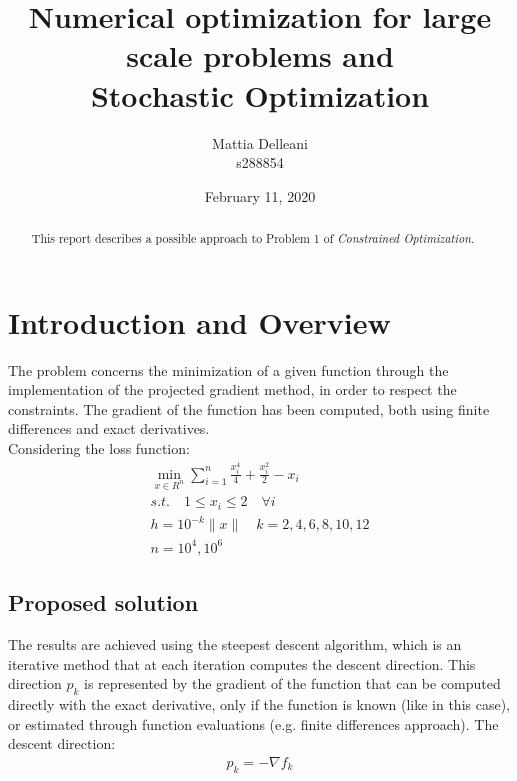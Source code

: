 \documentclass{article}
\title{Numerical optimization for large scale problems and \\Stochastic Optimization}
\author{Mattia Delleani\\s288854}
\date{February 11, 2020}
\begin{document}
\maketitle

\begin{abstract}
        This report describes a possible approach to Problem 1 of \emph{Constrained Optimization}. 
\end{abstract}

\section{Introduction and Overview}
The problem concerns the minimization of a given function through the implementation of the projected gradient method, in order to respect the constraints. The gradient of the function has been computed, both using finite differences and exact derivatives.\\
Considering the loss function: \\
\begin{gather}{\min_{x \in R^{n}}} \sum_{i=1}^{n}{\frac{x_{i}^4}{4} + \frac{x_{i}^2}{2}- x_{i}}\\ s.t. \quad 1 \leq x_{i} \leq2 \quad \forall i \\ h=10^{-k}\lVert x \rVert \quad k = 2,4,6,8,10,12 \\ n = 10^{4}, 10^{6}
\end{gather}

\subsection{Proposed solution}
The results are achieved using the steepest descent algorithm,
which is an iterative method that at each iteration computes the descent direction. This direction $p_{k}$ is represented by the gradient of the function that can be computed directly with the exact derivative, only if the function is known (like in this case), or estimated through function evaluations (e.g. finite differences approach). The descent direction:\begin{gather}
    p_{k} = -\nabla f_{k}
\end{gather}
\end{document}
